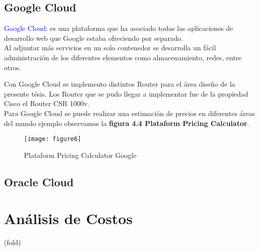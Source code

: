 \subsection{Google Cloud}

\textcolor{blue}{Google Cloud:} es una plataforma que ha asociado todas las aplicaciones de desarrollo web que Google 
estaba ofreciendo por separado.
\\
Al adjuntar más servicios en un solo contenedor se desarrolla un fácil administración de los diferentes elementos como almacenamiento, redes, entre otros.

Con Google Cloud se implemento distintos Router para el área diseño de la presente tésis. Los Router que se pudo llegar a implementar fue de la propiedad Cisco el Router CSR 1000v.
\\
Para Google Cloud se puede realizar una estimación de precios en diferentes áreas del mundo ejemplo observamos la \textbf{figura 4.4 Plataform Pricing Calculator}.

\begin{figure}[htbp]
  \centering
  {\texttt{[image: figure6]}}%
  \caption{Plataform Pricing Calculator Google}
  \label{fig:fig2subfig}
\end{figure}

\subsection{Oracle Cloud}

\section{Análisis de Costos} %
\label{sec:Análisis de Costos}
 (fold)








